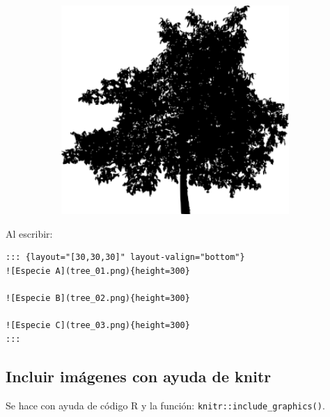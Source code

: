\documentclass[
  letterpaper,
  DIV=11,
  numbers=noendperiod]{scrartcl}
\begin{document}
\begin{figure}
\begin{minipage}{0.33\linewidth}
\begin{figure}[H]

\end{figure}%

\end{minipage}%
%
\begin{minipage}{0.33\linewidth}

\begin{figure}[H]

{\centering \includegraphics[width=\linewidth,height=3.125in,keepaspectratio]{tree_03.png}

}


\end{figure}%

\end{minipage}%

\end{figure}%

Al escribir:

\begin{verbatim}
::: {layout="[30,30,30]" layout-valign="bottom"}
![Especie A](tree_01.png){height=300}

![Especie B](tree_02.png){height=300}

![Especie C](tree_03.png){height=300}
:::
\end{verbatim}

\newpage{}

\subsection{Incluir imágenes con ayuda de
knitr}\label{incluir-imuxe1genes-con-ayuda-de-knitr}

Se hace con ayuda de código R y la función:
\texttt{knitr::include\_graphics()}.
\end{document}
